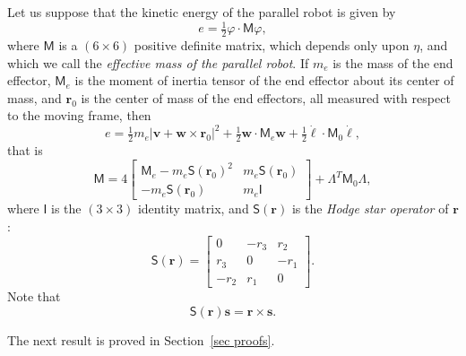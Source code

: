 \documentclass[reqno,12pt]{amsart}
\newcommand\starop[1]{\mathsf S(#1)}
\begin{document}
Let us suppose that the kinetic energy of the parallel robot is given by
\begin{equation}
\label{ke}
e = \tfrac12 \varphi \cdot \mathsf M \varphi,
\end{equation}
where $\mathsf M$ is a $(6 \times 6)$ positive definite matrix, which depends only upon $\eta$, and which we call the \emph{effective mass of the parallel robot}.  If $m_e$ is the mass of the end effector, $\mathsf M_e$ is the moment of inertia tensor of the end effector about its center of mass, and $\bm r_0$ is the center of mass of the end effectors, all measured with respect to the moving frame, then
\begin{equation}
e = \tfrac12 m_e |\bm v + \bm w \times \bm r_0|^2 + \tfrac12 \bm w \cdot \mathsf M_e \bm w + \tfrac12 \dot{\bm\ell} \cdot \mathsf M_0 \dot{\bm\ell} , 
\end{equation}
that is
\begin{equation}
\label{M example}
\mathsf M = 4 \begin{bmatrix} \mathsf M_e - m_e \starop{\bm r_0}^2 & m_e \starop{\bm r_0} \\ - m_e \starop{\bm r_0} & m_e \mathsf I \end{bmatrix} + \mathsf\Lambda^T \mathsf M_0 \mathsf\Lambda,
\end{equation}
where $\mathsf I$ is the $(3 \times 3)$ identity matrix, and $\starop{\bm r}$ is the \emph{Hodge star operator} of $\bm r$:
\begin{equation}
\starop{\bm r} = \begin{bmatrix}  0   & -r_3 &  r_2 \\
                               r_3 &  0   & -r_1 \\
                              -r_2 &  r_1 &  0 \end{bmatrix} .
\end{equation}
Note that
\begin{equation}
\label{r star to r cross}
\starop{\bm r} \bm s = \bm r \times \bm s .
\end{equation}

The next result is proved in Section~\ref{sec proofs}.
\end{document}
